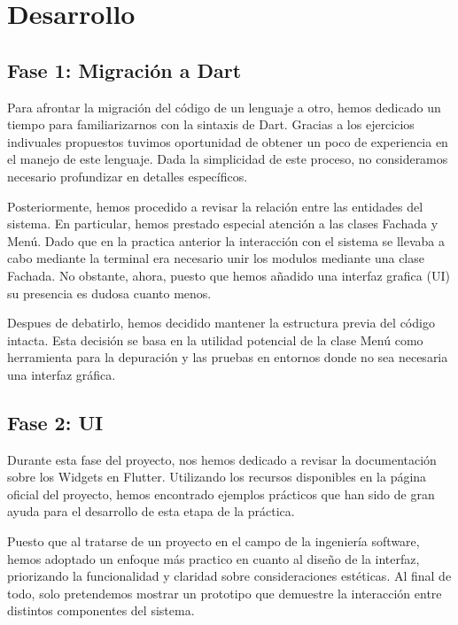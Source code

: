 \documentclass{article}
\begin{document}
\section{Desarrollo}

\subsection{Fase 1: Migración a Dart}

Para afrontar la migración del código de un lenguaje a otro, hemos dedicado un tiempo para familiarizarnos con la sintaxis de Dart. Gracias a los ejercicios indivuales propuestos tuvimos oportunidad de obtener un poco de experiencia en el manejo de este lenguaje. Dada la simplicidad de este proceso, no consideramos necesario profundizar en detalles específicos.

Posteriormente, hemos procedido a revisar la relación entre las entidades del sistema. En particular, hemos prestado especial atención a las clases Fachada y Menú. Dado que en la practica anterior la interacción con el sistema se llevaba a cabo mediante la terminal
era necesario unir los modulos mediante una clase Fachada. No obstante, ahora, puesto que hemos añadido una interfaz grafica (UI) su presencia es dudosa cuanto menos. 

Despues de debatirlo, hemos decidido mantener la estructura previa del código intacta. Esta decisión se basa en la utilidad potencial de la clase Menú como herramienta para la depuración y las pruebas en entornos donde no sea necesaria una interfaz gráfica.


\subsection{Fase 2: UI}



Durante esta fase del proyecto, nos hemos dedicado a revisar la documentación sobre los Widgets en Flutter. Utilizando los recursos disponibles en la página oficial del proyecto, hemos encontrado ejemplos prácticos que han sido de gran ayuda para el desarrollo de esta etapa de la práctica.

Puesto que al tratarse de un proyecto en el campo de la ingeniería software, hemos adoptado un enfoque más practico en cuanto al diseño de la interfaz, priorizando la funcionalidad y claridad sobre consideraciones estéticas. Al final de todo, solo pretendemos mostrar un prototipo que demuestre la interacción entre distintos componentes del sistema.  
\end{document}
